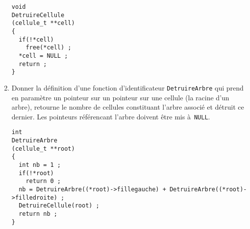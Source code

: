 \begin{enumerate}
\begin{correction}
\begin{verbatim}
void
DetruireCellule
(cellule_t **cell)
{
  if(!*cell)
    free(*cell) ;
  *cell = NULL ;
  return ;
}
\end{verbatim}
\end{correction}
\fi
\item Donner la d\'efinition d'une fonction d'identificateur
  \verb+DetruireArbre+ qui prend en param\`etre un pointeur sur un pointeur sur une
  cellule (la racine d'un arbre), retourne le nombre de cellules
  constituant l'arbre associ\'e et d\'etruit ce dernier. Les pointeurs r\'ef\'erencant l'arbre doivent \^etre mis \`a~\verb+NULL+. 
\ifcorrection
\begin{correction}
\begin{verbatim}
int
DetruireArbre
(cellule_t **root)
{
  int nb = 1 ;
  if(!*root)
    return 0 ;
  nb = DetruireArbre((*root)->fillegauche) + DetruireArbre((*root)->filledroite) ;
  DetruireCellule(root) ;
  return nb ;
}
\end{verbatim}
\end{correction}
\fi
\end{enumerate}

